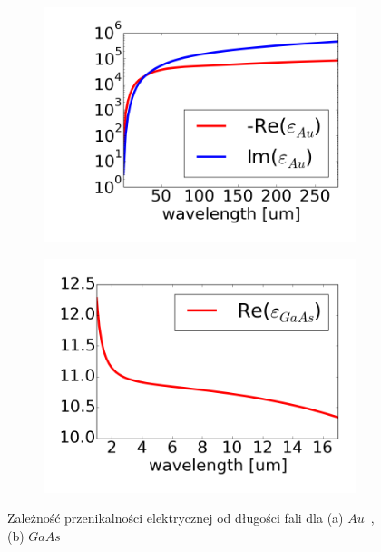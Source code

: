 \begin{figure}[tb]
	\begin{subfigure}{.45\textwidth}
		\includegraphics[width=\textwidth]{images/aueps.png}
		\label{fig:aueps}
	\end{subfigure}
	\begin{subfigure}{.45\textwidth}
		\includegraphics[width=\textwidth]{images/gaaseps.png}
		\label{fig:gaaseps}
	\end{subfigure}
	\caption{Zależność przenikalności elektrycznej od długości fali dla (a) $Au$~\cite{ordal1983optical}, (b) $GaAs$~\cite{skauli2003improved}}
\end{figure}


